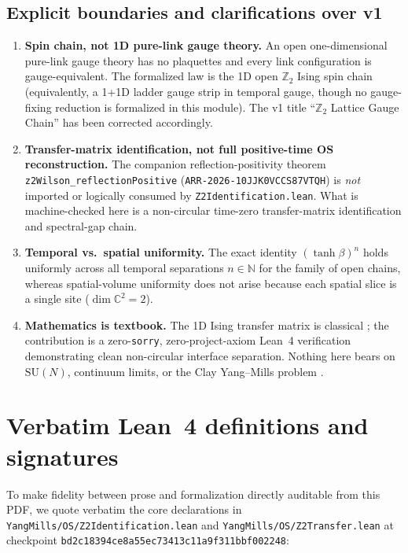 \documentclass[11pt]{article}
\theoremstyle{remark}
\theoremstyle{definition}
\newcommand{\lean}[1]{\texttt{#1}}
\newcommand{\anchor}{bd2c18394ce8a55ec73413c11a9f311bbf002248}
\newcommand{\C}{\mathbb{C}}
\newcommand{\Z}{\mathbb{Z}}
\newcommand{\SU}{\mathrm{SU}}
\begin{document}
\subsection{Explicit boundaries and clarifications over v1}

\begin{enumerate}
  \item \textbf{Spin chain, not 1D pure-link gauge theory.} An open one-dimensional
  pure-link gauge theory has no plaquettes and every link configuration is gauge-equivalent.
  The formalized law is the 1D open $\Z_2$ Ising spin chain (equivalently, a 1+1D ladder
  gauge strip in temporal gauge, though no gauge-fixing reduction is formalized in this
  module). The v1 title ``$\Z_2$ Lattice Gauge Chain'' has been corrected accordingly.
  \item \textbf{Transfer-matrix identification, not full positive-time OS reconstruction.}
  The companion reflection-positivity theorem \lean{z2Wilson\_reflectionPositive}
  (\texttt{ARR-2026-10JJK0VCCS87VTQH}) is \emph{not} imported or logically consumed by
  \lean{Z2Identification.lean}. What is machine-checked here is a non-circular
  time-zero transfer-matrix identification and spectral-gap chain.
  \item \textbf{Temporal vs.\ spatial uniformity.} The exact identity $(\tanh\beta)^n$
  holds uniformly across all temporal separations $n \in \mathbb{N}$ for the family of open
  chains, whereas spatial-volume uniformity does not arise because each spatial slice is a
  single site ($\dim \C^2 = 2$).
  \item \textbf{Mathematics is textbook.} The 1D Ising transfer matrix is classical
  \cite{Simon}; the contribution is a zero-\texttt{sorry}, zero-project-axiom Lean~4
  verification demonstrating clean non-circular interface separation. Nothing here bears on
  $\SU(N)$, continuum limits, or the Clay Yang--Mills problem \cite{Clay}.
\end{enumerate}

\section{Verbatim Lean~4 definitions and signatures}\label{sec:verbatim}

To make fidelity between prose and formalization directly auditable from this PDF, we quote
verbatim the core declarations in \texttt{YangMills/OS/Z2Identification.lean} and
\texttt{YangMills/OS/Z2Transfer.lean} at checkpoint \texttt{\anchor}:
\end{document}
